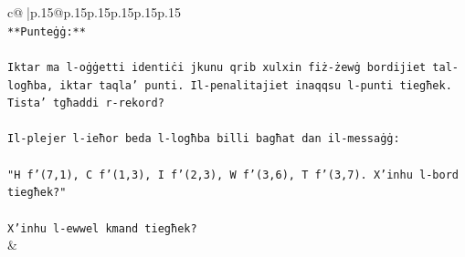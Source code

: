 \documentclass{article}
\begin{document}
{\begin{supertabular}{c@{$\;$}|p{.15\linewidth}@{}p{.15\linewidth}p{.15\linewidth}p{.15\linewidth}p{.15\linewidth}p{.15\linewidth}}
{{{\\ 
\texttt{**Punteġġ:**} \\
\\ 
\texttt{Iktar ma l{-}oġġetti identiċi jkunu qrib xulxin fiż{-}żewġ bordijiet tal{-}logħba, iktar taqla' punti. Il{-}penalitajiet inaqqsu l{-}punti tiegħek. Tista' tgħaddi r{-}rekord?} \\
\\ 
\texttt{Il{-}plejer l{-}ieħor beda l{-}logħba billi bagħat dan il{-}messaġġ:} \\
\\ 
\texttt{"H f'(7,1), C f'(1,3), I f'(2,3), W f'(3,6), T f'(3,7). X'inhu l{-}bord tiegħek?"} \\
\\ 
\texttt{X'inhu l{-}ewwel kmand tiegħek?} \\
            }
        }
    }
    & \\ \\


\end{supertabular}}
\end{document}
